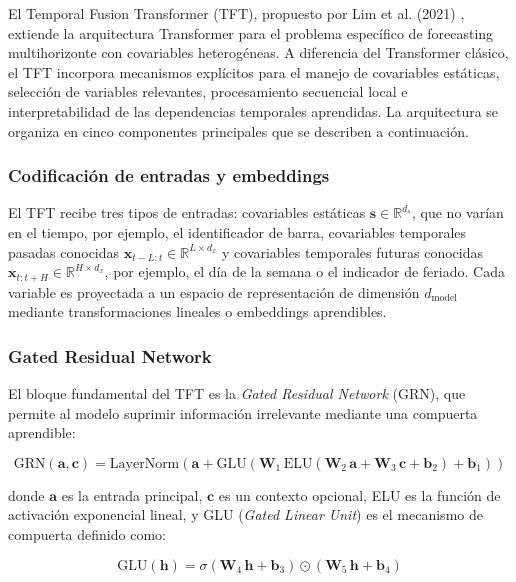 El Temporal Fusion Transformer (TFT), propuesto por Lim et al. (2021) \cite{TFT}, extiende la arquitectura Transformer para el problema específico de forecasting multihorizonte con covariables heterogéneas. A diferencia del Transformer clásico, el TFT incorpora mecanismos explícitos para el manejo de covariables estáticas, selección de variables relevantes, procesamiento secuencial local e interpretabilidad de las dependencias temporales aprendidas. La arquitectura se organiza en cinco componentes principales que se describen a continuación.

\subsubsection{Codificación de entradas y embeddings}

El TFT recibe tres tipos de entradas: covariables estáticas $\mathbf{s} \in \mathbb{R}^{d_s}$, que no varían en el tiempo, por ejemplo, el identificador de barra, covariables temporales pasadas conocidas $\mathbf{x}_{t-L:t} \in \mathbb{R}^{L \times d_x}$ y covariables temporales futuras conocidas $\mathbf{x}_{t:t+H} \in \mathbb{R}^{H \times d_x}$, por ejemplo, el día de la semana o el indicador de feriado. Cada variable es proyectada a un espacio de representación de dimensión $d_{\text{model}}$ mediante transformaciones lineales o embeddings aprendibles.

\subsubsection{Gated Residual Network}

El bloque fundamental del TFT es la \textit{Gated Residual Network} (GRN), que permite al modelo suprimir información irrelevante mediante una compuerta aprendible:

\begin{equation}
\text{GRN}(\mathbf{a}, \mathbf{c}) = \text{LayerNorm}\left(\mathbf{a} + \text{GLU}\left(\mathbf{W}_1 \, \text{ELU}(\mathbf{W}_2 \, \mathbf{a} + \mathbf{W}_3 \, \mathbf{c} + \mathbf{b}_2) + \mathbf{b}_1\right)\right)
\end{equation}

donde $\mathbf{a}$ es la entrada principal, $\mathbf{c}$ es un contexto opcional, ELU es la función de activación exponencial lineal, y GLU (\textit{Gated Linear Unit}) es el mecanismo de compuerta definido como:

\begin{equation}
\text{GLU}(\mathbf{h}) = \sigma(\mathbf{W}_4 \, \mathbf{h} + \mathbf{b}_3) \odot (\mathbf{W}_5 \, \mathbf{h} + \mathbf{b}_4)
\end{equation}

